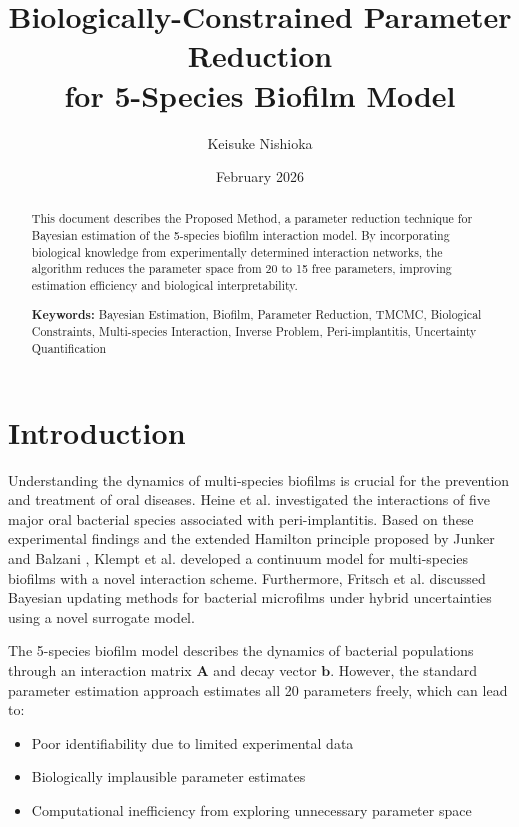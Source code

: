 \documentclass[11pt,a4paper]{article}
\title{Biologically-Constrained Parameter Reduction\\for 5-Species Biofilm Model}
\author{Keisuke Nishioka}
\date{February 2026}
\begin{document}
\maketitle

\begin{abstract}
This document describes the Proposed Method, a parameter reduction technique for Bayesian estimation of the 5-species biofilm interaction model. By incorporating biological knowledge from experimentally determined interaction networks, the algorithm reduces the parameter space from 20 to 15 free parameters, improving estimation efficiency and biological interpretability.

\vspace{0.5cm}
\noindent\textbf{Keywords:} Bayesian Estimation, Biofilm, Parameter Reduction, TMCMC, Biological Constraints, Multi-species Interaction, Inverse Problem, Peri-implantitis, Uncertainty Quantification
\end{abstract}

\tableofcontents
\newpage

\section{Introduction}

Understanding the dynamics of multi-species biofilms is crucial for the prevention and treatment of oral diseases. Heine et al. \cite{Heine2025PeriImplant} investigated the interactions of five major oral bacterial species associated with peri-implantitis. Based on these experimental findings and the extended Hamilton principle proposed by Junker and Balzani \cite{JunkerBalzani2021ExtendedHamilton}, Klempt et al. \cite{Klempt2025ContinuumBiofilm} developed a continuum model for multi-species biofilms with a novel interaction scheme. Furthermore, Fritsch et al. \cite{Fritsch2025BayesianMicrofilms} discussed Bayesian updating methods for bacterial microfilms under hybrid uncertainties using a novel surrogate model.

The 5-species biofilm model describes the dynamics of bacterial populations through an interaction matrix $\mathbf{A}$ and decay vector $\mathbf{b}$. However, the standard parameter estimation approach estimates all 20 parameters freely, which can lead to:

\begin{itemize}
    \item Poor identifiability due to limited experimental data
    \item Biologically implausible parameter estimates
    \item Computational inefficiency from exploring unnecessary parameter space
\end{itemize}
\end{document}
